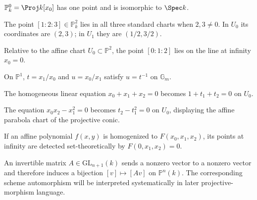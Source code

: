 \begin{example}\label{ex:vi36-01}
\(\mathbb P^0_k=\Proj k[x_0]\) has one point and is isomorphic to \(\Spec k\).
\end{example}

\begin{example}\label{ex:vi36-02}
The point \([1:2:3]\in\mathbb P^2_k\) lies in all three standard charts when \(2,3\ne0\).  In \(U_0\) its coordinates are \((2,3)\); in \(U_1\) they are \((1/2,3/2)\).
\end{example}

\begin{example}\label{ex:vi36-03}
Relative to the affine chart \(U_0\subset\mathbb P^2\), the point \([0:1:2]\) lies on the line at infinity \(x_0=0\).
\end{example}

\begin{example}\label{ex:vi36-04}
On \(\mathbb P^1\), \(t=x_1/x_0\) and \(u=x_0/x_1\) satisfy \(u=t^{-1}\) on \(\mathbb G_m\).
\end{example}

\begin{example}\label{ex:vi36-05}
The homogeneous linear equation \(x_0+x_1+x_2=0\) becomes \(1+t_1+t_2=0\) on \(U_0\).
\end{example}

\begin{example}\label{ex:vi36-06}
The equation \(x_0x_2-x_1^2=0\) becomes \(t_2-t_1^2=0\) on \(U_0\), displaying the affine parabola chart of the projective conic.
\end{example}

\begin{example}\label{ex:vi36-07}
If an affine polynomial \(f(x,y)\) is homogenized to \(F(x_0,x_1,x_2)\), its points at infinity are detected set-theoretically by \(F(0,x_1,x_2)=0\).
\end{example}

\begin{example}\label{ex:vi36-08}
An invertible matrix \(A\in\mathrm{GL}_{n+1}(k)\) sends a nonzero vector to a nonzero vector and therefore induces a bijection \([v]\mapsto[Av]\) on \(\mathbb P^n(k)\).  The corresponding scheme automorphism will be interpreted systematically in later projective-morphism language.
\end{example}

